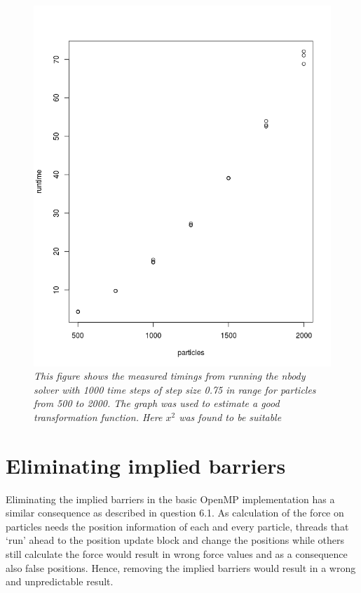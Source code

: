 \documentclass[a4paper,11pt,twoside]{article}
\begin{document}
\begin{figure}
  \centering
  \includegraphics[width=1\textwidth]{nbody.png}
  \caption{\textit{This figure shows the measured timings from running the nbody solver with 1000 time steps of step size 0.75 in range for particles from 500 to 2000. The graph was used to estimate a good transformation function. Here $x^2$ was found to be suitable }}
  \label{fig:nbody}
\end{figure}

\section{Eliminating implied barriers}
Eliminating the implied barriers in the basic OpenMP implementation has a similar consequence as described in question 6.1. As calculation of the force on particles needs the position information of each and every particle, threads that `run' ahead to the position update block and change the positions while others still calculate the force would result in wrong force values and as a consequence also false positions. Hence, removing the implied barriers would result in a wrong and unpredictable result.
  
\end{document}
